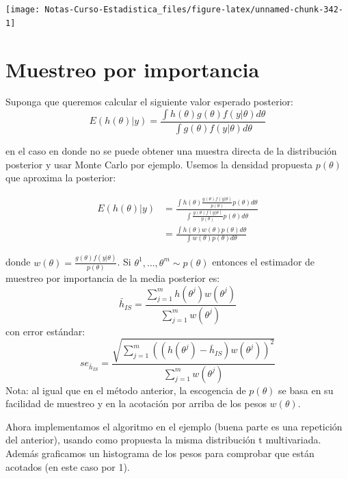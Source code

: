 \documentclass[
  12pt,
]{book}
\theoremstyle{definition}
\theoremstyle{definition}
\theoremstyle{definition}
\theoremstyle{definition}
\theoremstyle{remark}
\begin{document}
\begin{center}\texttt{[image: Notas-Curso-Estadistica\_files/figure-latex/unnamed-chunk-342-1]} \end{center}

\hypertarget{muestreo-por-importancia}{%
\section{Muestreo por importancia}\label{muestreo-por-importancia}}

Suponga que queremos calcular el siguiente valor esperado posterior:
\[E(h(\theta)|y)=\frac{\int h(\theta)g(\theta)f(y|\theta)d\theta}{\int g(\theta)f(y|\theta)d\theta}\]

en el caso en donde no se puede obtener una muestra directa de la distribución posterior y usar Monte Carlo por ejemplo. Usemos la densidad propuesta \(p(\theta)\) que aproxima la posterior:

\begin{align*}
E(h(\theta)|y)&=\frac{\int h(\theta)\frac{g(\theta)f(y|\theta)}{p(\theta)}p(\theta)d\theta}{\int \frac{g(\theta)f(y|\theta)}{p(\theta)}p(\theta)d\theta}\\
&=\frac{\int h(\theta)w(\theta)p(\theta)d\theta}{\int w(\theta)p(\theta)d\theta}
\end{align*}

donde \(w(\theta)=\frac{g(\theta)f(y|\theta)}{p(\theta)}\). Si \(\theta^1,\ldots,\theta^{m}\sim p(\theta)\) entonces el estimador de muestreo por importancia de la media posterior es:
\[\bar h_{IS}=\frac{\sum_{j=1}^mh(\theta^j)w(\theta^j)}{\sum_{j=1}^mw(\theta^j)}\]
con error estándar:
\[se_{\bar h_{IS}}=\frac{\sqrt{\sum_{j=1}^m((h(\theta^j)-\bar h_{IS})w(\theta^j))^2}}{\sum_{j=1}^mw(\theta^j)}\]
Nota: al igual que en el método anterior, la escogencia de \(p(\theta)\) se basa en su facilidad de muestreo y en la acotación por arriba de los pesos \(w(\theta)\).

Ahora implementamos el algoritmo en el ejemplo (buena parte es una repetición del anterior), usando como propuesta la misma distribución t multivariada. Además graficamos un histograma de los pesos para comprobar que están acotados (en este caso por 1).
\end{document}

